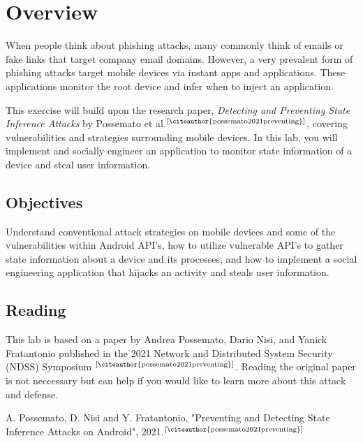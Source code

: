\documentclass[letterpaper,12pt]{report}
\begin{document}
\clearpage
{}
\settableofcontents
\tableofcontents
\clearpage


\section*{Overview}\label{sec:work-carried-out}

When people think about phishing attacks, many commonly think of emails or fake links that target company email domains. However, a very prevalent form of phishing attacks target mobile devices via instant apps and applications. These applications monitor the root device and infer when to inject an application. 

This exercise will build upon the research paper, \textit{Detecting and Preventing State Inference Attacks} by Possemato et al.$^\text{[\citeauthor{possemato2021preventing}]}$, covering vulnerabilities and strategies surrounding mobile devices. In this lab, you will implement and socially engineer an application to monitor state information of a device and steal user information.

\subsection*{Objectives}

Understand conventional attack strategies on mobile devices and some of the vulnerabilities within Android API’s, how to utilize vulnerable API’s to gather state information about a device and its processes, and how to implement a social engineering application that hijacks an activity and steals user information.

\subsection*{Reading}

This lab is based on a paper by Andrea Possemato, Dario Nisi, and Yanick Fratantonio published in the 2021 Network and Distributed System Security (NDSS) Symposium $^\text{[\citeauthor{possemato2021preventing}]}$. Reading the original paper is not neccessary but can help if you would like to learn more about this attack and defense.

A. Possemato, D. Nisi and Y. Fratantonio, "Preventing and Detecting State Inference Attacks on Android", 2021.$^\text{[\citeauthor{possemato2021preventing}]}$
\end{document}
